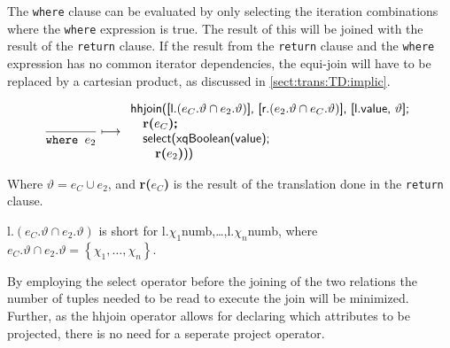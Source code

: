 The \texttt{where} clause can be evaluated by only selecting the iteration combinations where the \texttt{where}
expression is true. The result of this will be joined with the result of the \texttt{return} clause. If the result
from the \texttt{return} clause and the \texttt{where} expression has no common iterator dependencies, the
equi-join will have to be replaced by a cartesian product, as discussed in \ref{sect:trans:TD:implic}.

\begin{equation}
\frac{}{\mbox{\texttt{where }}e_2}\longmapsto
\begin{array}{l}
\mbox{\textsf{hhjoin([l.}}(e_{C}.\vartheta \cap e_2.\vartheta)\mbox{\textsf{], [r.}}(e_{2}.\vartheta \cap
e_{C}.\vartheta)\mbox{\textsf{], [l.value, }} \vartheta\mbox{\textsf{];}} \\ \quad
\mbox{\textbf{r(}}e_{C}\mbox{\textbf{)\textsf{;}}} \\ \quad
\mbox{\textsf{select(xqBoolean(value);}} \\ \quad \quad
\mbox{\textbf{r(}}e_{2}\mbox{\textbf{)}\textsf{))}}
\end{array}
\label{rule:trans:TD:where}
\end{equation}

Where $\vartheta = e_{C} \cup e_{2}$, and \textbf{r(}$e_{C}$\textbf{)} is the result of the translation done in
the \texttt{return} clause.

\textsf{l.}$(e_{C}.\vartheta \cap e_2.\vartheta)$ is short for
\textsf{l.}$\chi_1$\textsf{numb,\ldots,l.}$\chi_n$\textsf{numb}, where $e_{C}.\vartheta \cap e_2.\vartheta =
\left\{\chi_1,\ldots,\chi_n\right\}$.

By employing the \textsf{select} operator before the joining of the two relations the number of tuples needed to
be read to execute the join will be minimized. Further, as the \textsf{hhjoin} operator allows for declaring which
attributes to be projected, there is no need for a seperate \textsf{project} operator.


